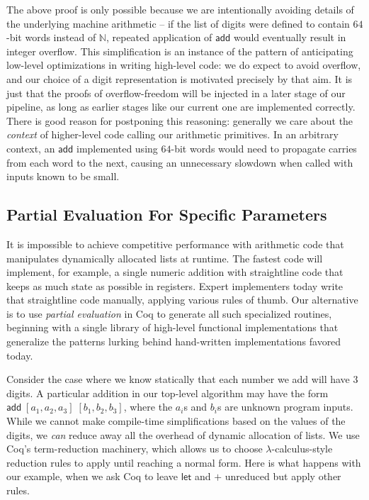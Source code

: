 \documentclass[conference,letterpaper]{IEEEtran}
\newcommand{\kw}[1]{\mathsf{#1}}
\newcommand{\id}[1]{\bm{\mathsf{#1}}}
\newcommand{\nat}[0]{\mathbb N}
\begin{document}
The above proof is only possible because we are intentionally avoiding details of the underlying machine arithmetic --
if the list of digits were defined to contain $64$-bit words instead of $\nat$, repeated application of $\id{add}$ would eventually result in integer overflow.
This simplification is an instance of the pattern of anticipating low-level optimizations in writing high-level code: we do expect to avoid overflow, and our choice of a digit representation is motivated precisely by that aim.
It is just that the proofs of overflow-freedom will be injected in a later stage of our pipeline, as long as earlier stages like our current one are implemented correctly.
There is good reason for postponing this reasoning: generally we care about the \emph{context} of higher-level code calling our arithmetic primitives.
In an arbitrary context, an $\id{add}$ implemented using $64$-bit words would need to propagate carries from each word to the next, causing an unnecessary slowdown when called with inputs known to be small.

\subsection{Partial Evaluation For Specific Parameters}\label{partial}

It is impossible to achieve competitive performance with arithmetic code that manipulates dynamically allocated lists at runtime.
The fastest code will implement, for example, a single numeric addition with straightline code that keeps as much state as possible in registers.
Expert implementers today write that straightline code manually, applying various rules of thumb.
Our alternative is to use \emph{partial evaluation} in Coq to generate all such specialized routines, beginning with a single library of high-level functional implementations that generalize the patterns lurking behind hand-written implementations favored today.

Consider the case where we know statically that each number we add will have 3 digits.
A particular addition in our top-level algorithm may have the form $\id{add} \; [a_1, a_2, a_3] \; [b_1, b_2, b_3]$, where the $a_i$s and $b_i$s are unknown program inputs.
While we cannot make compile-time simplifications based on the values of the digits, we \emph{can} reduce away all the overhead of dynamic allocation of lists.
We use Coq's term-reduction machinery, which allows us to choose $\lambda$-calculus-style reduction rules to apply until reaching a normal form.
Here is what happens with our example, when we ask Coq to leave $\kw{let}$ and $+$ unreduced but apply other rules.
\end{document}
